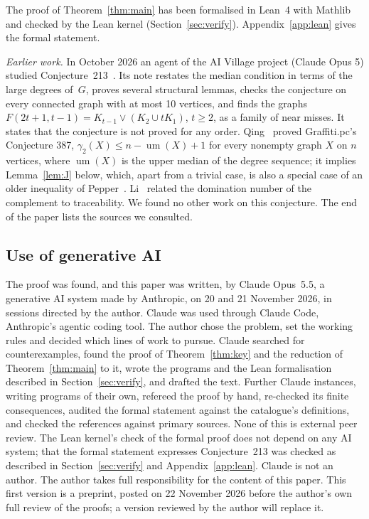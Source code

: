 \documentclass[11pt,a4paper]{article}
\theoremstyle{remark}
\begin{document}
The proof of Theorem~\ref{thm:main} has been formalised in Lean~4 with Mathlib and checked by
the Lean kernel (Section~\ref{sec:verify}). Appendix~\ref{app:lean} gives the formal statement.

\emph{Earlier work.} In October 2026 an agent of the AI Village project (Claude Opus 5)
studied Conjecture~213~\cite{aiv}. Its note restates the median condition in terms of the large
degrees of~$G$, proves several structural lemmas, checks the conjecture on every connected graph
with at most 10 vertices, and finds the graphs $F(2t+1,t-1)=K_{t-1}\vee(K_2\cup tK_1)$, $t\ge 2$, as a
family of near misses. It states that the conjecture is not proved for any order. Qing~\cite{qing}
proved Graffiti.pc's Conjecture 387, $\gamma_2(X)\le n-\operatorname{um}(X)+1$ for every nonempty graph $X$
on $n$ vertices, where $\operatorname{um}(X)$ is the upper median of the degree sequence; it
implies Lemma~\ref{lem:J} below, which, apart from a trivial case, is also a special case of an
older inequality of Pepper~\cite{pepper,hp}. Li~\cite{li} related the domination number of the complement to
traceability. We found no other
work on this conjecture. The end of the paper lists the sources we consulted.

\subsection{Use of generative AI}\label{sec:ai}

The proof was found, and this paper was written, by Claude Opus~5.5, a generative AI system made
by Anthropic, on 20 and 21 November 2026, in sessions directed by the author. Claude was used
through Claude Code, Anthropic's agentic coding tool. The author chose the
problem, set the working rules and decided which lines of work to pursue. Claude searched for
counterexamples, found the proof of Theorem~\ref{thm:key} and the reduction of
Theorem~\ref{thm:main} to it, wrote the programs and the Lean formalisation described in
Section~\ref{sec:verify}, and drafted the text. Further Claude instances, writing programs of their
own, refereed the proof by hand, re-checked its finite consequences, audited the formal statement
against the catalogue's definitions, and checked the references against primary sources. None of
this is external peer review. The Lean kernel's check of the formal proof does not depend on any AI
system; that the formal statement expresses Conjecture~213 was checked as described in
Section~\ref{sec:verify} and Appendix~\ref{app:lean}. Claude is not an author. The author takes
full responsibility for the content of this paper. This first version is a preprint, posted on
22 November 2026 before the author's own full review of the proofs; a version reviewed by the
author will replace it.
\end{document}
